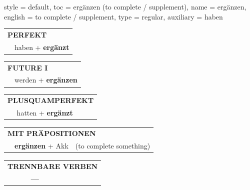 \begin{verbentry}{
  style = {default},
  toc = {ergänzen (to complete / supplement)},
  name = {ergänzen},
  english = {to complete / supplement},
  type = {regular},
  auxiliary = {haben}
}
\vspace{10pt}

\begin{tabular}{rl}
\multicolumn{2}{l}{\textbf{PERFEKT}}\\
& haben + \textbf{ergänzt}\\
\end{tabular}
\hfill
\begin{tabular}{rl}
\multicolumn{2}{l}{\textbf{FUTURE I}}\\
& werden + \textbf{ergänzen}\\
\end{tabular}
\hfill
\begin{tabular}{rl}
\multicolumn{2}{l}{\textbf{PLUSQUAMPERFEKT}}\\
& hatten + \textbf{ergänzt}\\
\end{tabular}

\vspace{10pt}

\begin{tabular}{lll}
\multicolumn{3}{l}{\textbf{MIT PRÄPOSITIONEN}}\\
& \textbf{ergänzen} + Akk & (to complete something)\\
\end{tabular}
\hfill
\begin{tabular}{lll}
\multicolumn{3}{l}{\textbf{TRENNBARE VERBEN}}\\
& \textbf{---} & \\
\end{tabular}

\vspace{-5pt}
\end{verbentry}

